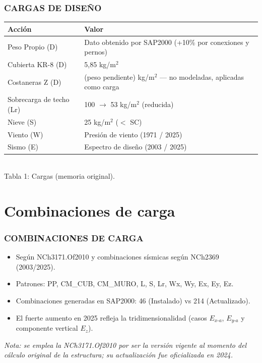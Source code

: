 \documentclass[11.5pt,aspectratio=169,handout]{beamer}
\newcommand{\ctitle}[1]{\frametitle{#1}}
\begin{document}
\begin{frame}
\ctitle{CARGAS DE DISEÑO}
\vspace{5mm}
\begin{center}
  {\small
  \begin{tabular}{@{}lp{7.5cm}@{}}
    \toprule
    Acción & Valor \\
    \midrule
    Peso Propio (D) & Dato obtenido por SAP2000 (+10\% por conexiones y pernos) \\
    Cubierta KR-8 (D) & 5,85 kg/m$^2$ \\
    Costaneras Z (D) & \alert{(peso pendiente)} kg/m$^2$ --- no modeladas, aplicadas como carga \\
    Sobrecarga de techo (Lr) & 100 $\to$ \alert{53} kg/m$^2$ (reducida) \\
    Nieve (S) & \alert{25} kg/m$^2$ ($<$ SC) \\
    Viento (W) & Presión de viento (1971 / 2025) \\
    Sismo (E) & Espectro de diseño (2003 / 2025) \\
    \bottomrule
  \end{tabular}}\\[3mm]
  {\small Tabla 1: Cargas (memoria original).}
\end{center}
\end{frame}

\section{Combinaciones de carga}

\begin{frame}
\ctitle{COMBINACIONES DE CARGA}
\vspace{5mm}
\begin{itemize}\small\setlength{\itemsep}{4mm}
  \item Según \alert{NCh3171.Of2010} y combinaciones sísmicas
        según NCh2369 (2003/2025).
  \item Patrones: PP, CM\_CUB, CM\_MURO, L, S,
        Lr, Wx, Wy, Ex, Ey, Ez.
  \item Combinaciones generadas en SAP2000: \alert{46}
        (Instalado) vs \alert{214} (Actualizado).
  \item El fuerte aumento en 2025 refleja la
        \alert{tridimensionalidad} (casos $E_{x\text{-}a}$, $E_{y\text{-}a}$ y
        componente vertical $E_z$).
\end{itemize}
\vspace{2mm}
{\footnotesize\textit{Nota: se emplea la NCh3171.Of2010 por ser la versión
vigente al momento del cálculo original de la estructura; su actualización
fue oficializada en 2024.}}
\end{frame}
\end{document}
